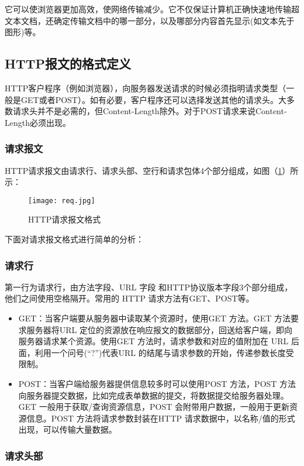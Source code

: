 \documentclass[bachelor]{thesis-uestc}
\begin{document}
它可以使浏览器更加高效，使网络传输减少。它不仅保证计算机正确快速地传输超文本文档，还确定传输文档中的哪一部分，以及哪部分内容首先显示(如文本先于图形)等。
\subsection{HTTP报文的格式定义}

HTTP客户程序（例如浏览器），向服务器发送请求的时候必须指明请求类型（一般是GET或者POST）。如有必要，客户程序还可以选择发送其他的请求头。大多数请求头并不是必需的，但Content-Length除外。对于POST请求来说Content-Length必须出现。 

\subsubsection{请求报文}

HTTP请求报文由请求行、请求头部、空行和请求包体4个部分组成，如图（\ref{httpreq}）所示：
\begin{figure}[h]
\texttt{[image: req.jpg]}
\caption{HTTP请求报文格式}
\label{httpreq} 
\end{figure}

下面对请求报文格式进行简单的分析：

\subsubsection*{请求行}

第一行为请求行，由方法字段、URL 字段 和HTTP协议版本字段3个部分组成，他们之间使用空格隔开。常用的 HTTP 请求方法有GET、POST等。

\begin{itemize}
	\item GET：当客户端要从服务器中读取某个资源时，使用GET 方法。GET 方法要求服务器将URL 定位的资源放在响应报文的数据部分，回送给客户端，即向服务器请求某个资源。使用GET 方法时，请求参数和对应的值附加在 URL 后面，利用一个问号(“?”)代表URL 的结尾与请求参数的开始，传递参数长度受限制。
	\item POST：当客户端给服务器提供信息较多时可以使用POST 方法，POST 方法向服务器提交数据，比如完成表单数据的提交，将数据提交给服务器处理。GET 一般用于获取/查询资源信息，POST 会附带用户数据，一般用于更新资源信息。POST 方法将请求参数封装在HTTP 请求数据中，以名称/值的形式出现，可以传输大量数据。
\end{itemize}

\subsubsection*{请求头部}
\end{document}
